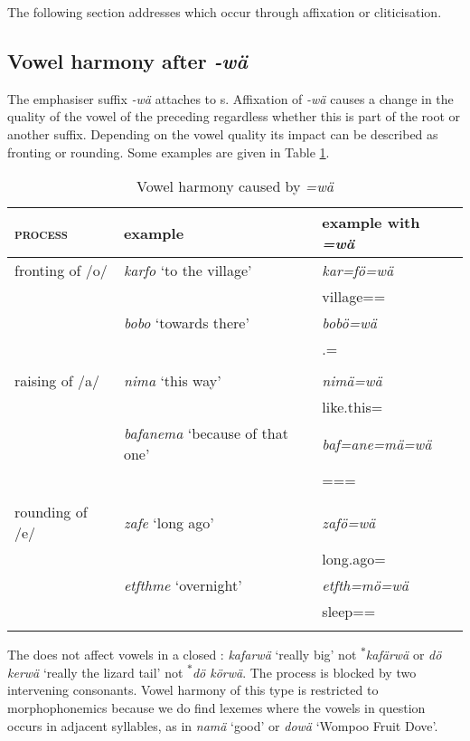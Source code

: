 The following section addresses  which occur through affixation or cliticisation.

\subsection{Vowel harmony after \emph{-wä}} \label{vowharmwae}

The emphasiser suffix \emph{-wä} attaches to s. Affixation of \emph{-wä} causes a change in the quality of the vowel of the preceding  regardless whether this  is part of the root or another suffix. Depending on the vowel quality its impact can be described as fronting or rounding. Some examples are given in Table \ref{vowelharmwae}.

\begin{table}
\caption{Vowel harmony caused by \emph{=wä}}
\label{vowelharmwae}
	\begin{tabularx}{\textwidth}{Xll}
		\lsptoprule
		\textsc{process}&{example}& {example with} \emph{=wä} \\ \midrule
		fronting of /o/&\emph{karfo} `to the village' & \emph{kar=fö=wä} \\
		&&village=\Abl{}=\Emph{}\\
		&\emph{bobo} `towards there' & \emph{bobö=wä}\\
		&&\Med{}.\All{}=\Emph{}\\
		&&\\
		raising of /a/&\emph{nima} `this way' & \emph{nimä=wä}\\
		&&like.this=\Emph{}\\
		&\emph{bafanema} `because of that one' & \emph{baf=ane=mä=wä}\\
		&&\Recog=\Poss=\Char=\Emph{}\\
		&&\\
		rounding of /e/&\emph{zafe} `long ago' & \emph{zafö=wä}\\
		&&long.ago=\Emph\\
		&\emph{etfthme} `overnight' & \emph{etfth=mö=wä}\\
		&&sleep=\Ins=\Emph\\
		\lspbottomrule
	\end{tabularx}
\end{table}	%

The  does not affect vowels in a closed : \emph{kafarwä} `really big' not \textsuperscript{$\ast$}\emph{kafärwä} or \emph{dö kerwä} `really the lizard tail' not \textsuperscript{$\ast$}\emph{dö körwä}. The process is blocked by two intervening consonants. Vowel harmony of this type is restricted to morphophonemics because we do find lexemes where the vowels in question occurs in adjacent syllables, as in \emph{namä} `good' or \emph{dowä} `Wompoo Fruit Dove'.

